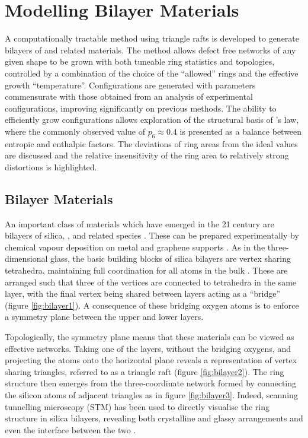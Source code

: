 \chapter[Modelling Bilayer Materials]{Modelling Bilayer Materials}
\label{ch:bilayers}

\begin{chapterabstract}
A computationally tractable \mc{} method using triangle rafts is developed to generate bilayers of \sioii{} and related materials.
The method allows defect free networks of any given shape to be grown with both tuneable ring statistics and topologies, controlled by a combination of the choice of the ``allowed'' rings and the effective growth ``temperature''. 
Configurations are generated with \aw{} parameters commensurate with those obtained from an analysis of experimental configurations, improving significantly on previous methods.
The ability to efficiently grow configurations allows exploration of the structural basis of \lm’s law, where the commonly observed value of $p_6\approx0.4$ is presented as a balance between entropic and enthalpic factors. 
The deviations of ring areas from the ideal values are discussed and the relative insensitivity of the ring area to relatively strong distortions is highlighted.
\end{chapterabstract}

\section{Bilayer Materials}

An important class of \td{} materials which have emerged in the 21\st{} century are bilayers of silica, \sioii, and related species \cite{Buchner2017}.
These can be prepared experimentally by chemical vapour deposition on metal and graphene supports \cite{Huang2012,Lichtenstein2012a}.
As in the three\--dimensional glass, the basic building blocks of silica bilayers are vertex sharing \sioiv{} tetrahedra, maintaining full coordination for all atoms in the bulk \cite{Wilson2013}.
These are arranged such that three of the vertices are connected to tetrahedra in the same layer, with the final vertex being shared between layers acting as a ``bridge'' (figure \ref{fig:bilayer1}).
A consequence of these bridging oxygen atoms is to enforce a symmetry plane between the upper and lower layers.

Topologically, the symmetry plane means that these materials can be viewed as effective \td{} networks.
Taking one of the layers, without the bridging oxygens, and projecting the atoms onto the horizontal plane reveals a representation of vertex sharing triangles, referred to as a triangle raft (figure \ref{fig:bilayer2}).
The ring structure then emerges from the three\--coordinate network formed by connecting the silicon atoms of adjacent triangles as in figure \ref{fig:bilayer3}.
Indeed, scanning tunnelling microscopy (STM) has been used to directly visualise the ring structure in silica bilayers, revealing both crystalline and glassy arrangements and even the interface between the two   \cite{Loffler2010,Lichtenstein2012b}.

